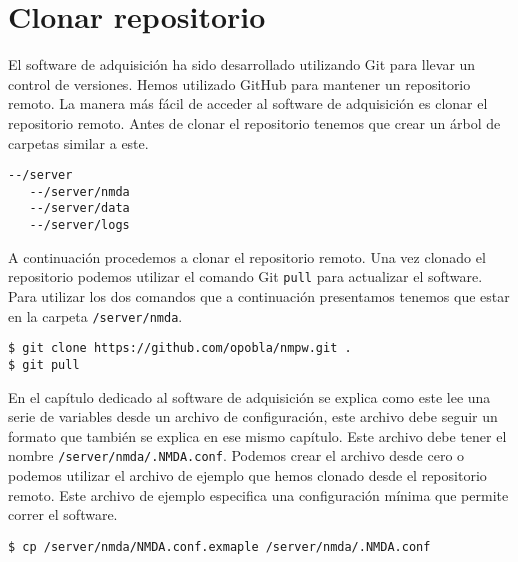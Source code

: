 	\section{Clonar repositorio}
		El software de adquisición ha sido desarrollado utilizando Git para llevar un control de versiones. Hemos utilizado GitHub para
		mantener un repositorio remoto. La manera más fácil de acceder al software de adquisición es clonar el repositorio remoto. Antes de
		clonar el repositorio tenemos que crear un árbol de carpetas similar a este.
		\begin{lstlisting}[style=myBash]
--/server
   --/server/nmda
   --/server/data
   --/server/logs
		\end{lstlisting}
		A continuación procedemos a clonar el repositorio remoto. Una vez clonado el repositorio podemos utilizar el comando Git \texttt{pull}
		para actualizar el software. Para utilizar los dos comandos que a continuación presentamos tenemos que estar en la carpeta
		\texttt{/server/nmda}.
		\begin{lstlisting}[style=myBash]
$ git clone https://github.com/opobla/nmpw.git .
$ git pull
		\end{lstlisting}
		En el capítulo dedicado al software de adquisición se explica como este lee una serie de variables desde un archivo de configuración,
		este archivo debe seguir un formato que también se explica en ese mismo capítulo. Este archivo debe tener el nombre
		\texttt{/server/nmda/.NMDA.conf}. Podemos crear el archivo desde cero o podemos utilizar el archivo de ejemplo que hemos clonado desde
		el repositorio remoto. Este archivo de ejemplo especifica una configuración mínima que permite correr el software. 
		\begin{lstlisting}[style=myBash]
$ cp /server/nmda/NMDA.conf.exmaple /server/nmda/.NMDA.conf
		\end{lstlisting}
